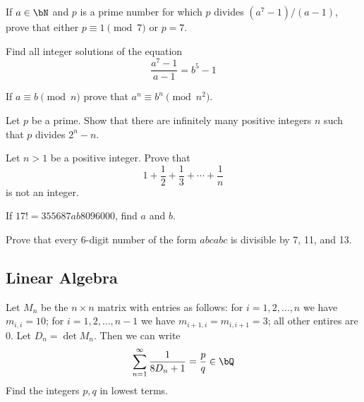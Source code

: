\documentclass[12pt]{article}
\begin{document}
        \begin{exercise}
            If $a\in \bN$ and $p$ is a prime number for which $p$ divides $(a^7-1)/(a-1)$, prove that either $p \equiv 1 \pmod{7}$ or $p=7$.
        \end{exercise}
        
        \begin{exercise}
            Find all integer solutions of the equation
            \[\frac{a^7-1}{a-1} = b^5-1\]
        \end{exercise}
        
        \begin{exercise}
            If $a\equiv b \pmod{n}$ prove that $a^n \equiv b^n \pmod{n^2}$.
        \end{exercise}
        
        \begin{exercise}
            Let $p$ be a prime. Show that there are infinitely many positive integers $n$ such that $p$ divides $2^n-n$.
        \end{exercise}
        
        \begin{exercise}
            Let $n>1$ be a positive integer. Prove that 
            \[1+\frac{1}{2}+\frac{1}{3}+\cdots + \frac{1}{n}\] is not an integer.
        \end{exercise}

        \begin{exercise}
            If \(17!=355687ab8096000\), find \(a\) and \(b\).
        \end{exercise}
    
        \begin{exercise}
            Prove that every 6-digit number of the form \(abcabc\) is divisible by 7, 11, and 13.
        \end{exercise}

    \subsection{Linear Algebra}

        \begin{exercise}
            Let \(M_n\) be the \(n\times n\) matrix with entries as follows: for \(i=1,2,\ldots,n\) we have \(m_{i,i}=10\); for \(i=1,2,\ldots,n-1\) we have \(m_{i+1,i}=m_{i,i+1}=3\); all other entires are 0.
            Let \(D_n=\det M_n\).
            Then we can write
            \[\sum_{n=1}^\infty \frac{1}{8D_n+1} = \frac{p}{q}\in\bQ\]
            Find the integers \(p,q\) in lowest terms.
        \end{exercise}
\end{document}
